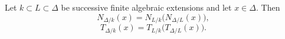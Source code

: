 Let $k \subset L \subset \Delta$ be successive finite algebraic extensions and let $x \in \Delta$. Then
$$N_{\Delta/k}(x) = N_{L/k}\big(N_{\Delta/L}(x)\big),$$
$$T_{\Delta/k}(x) = T_{L/k}\big(T_{\Delta/L}(x)\big).$$
